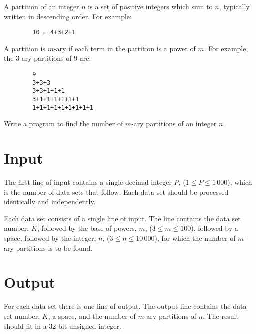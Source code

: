 
A partition of an integer $n$ is a set of positive integers which sum to $n$, 
typically written in descending order. For example:

\begin{verbatim}
        10 = 4+3+2+1
\end{verbatim}

A partition is $m$-ary if each term in the partition is a power of $m$. 
For example, the $3$-ary partitions of $9$ are:

\begin{verbatim}
        9
        3+3+3
        3+3+1+1+1
        3+1+1+1+1+1+1
        1+1+1+1+1+1+1+1+1
\end{verbatim}

Write a program to find the number of $m$-ary partitions of an integer $n$.

\section*{Input}

The first line of input contains a single decimal integer $P$, ($1 \le P \le 1\,000$), which is the number of
data sets that follow. Each data set should be processed identically and independently.

Each data set consists of a single line of input. The line contains the data set number, $K$, 
followed by the base of powers, $m$, ($3 \le m \le 100$), followed by a space, followed by the integer,
$n$, ($3 \le n \le 10\,000$), for which the number of $m$-ary partitions is to be found.

\section*{Output}

For each data set there is one line of output. The output line contains the data set number, $K$, a
space, and the number of $m$-ary partitions of $n$. The result should fit in a 32-bit unsigned integer.
